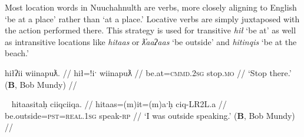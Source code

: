 \vspace{10pt}

Most location words in Nuuchahnulth are verbs, more closely aligning to English `be at a place' rather than `at a place.' Locative verbs are simply juxtaposed with the action performed there. This strategy is used for transitive \textit{hił} `be at' as well as intransitive locations like \textit{hitaas} or \textit{ƛ̓aaʔaas} `be outside' and \textit{hitinqis} `be at the beach.'

\ex \label{ex:stopthere}
\begingl
\glpreamble hiłʔii wiinapuƛ. //
\gla hił=!iˑ wiinapuƛ //
\glb be.at=\textsc{cmmd.2sg} stop.\textsc{mo} //
\glft `Stop there.' (\textbf{B}, Bob Mundy) //
\endgl
\xe

\begin{comment}
\ex \label{ex:workathome}
\begingl
\glpreamble hiłitin maḥt̓iiʔakqas mamuuk. //
\gla hił=(m)it=(m)in maḥt̓ii=ʔak=qaˑs mamuuk //
\glb be.at=\textsc{pst}=\textsc{strg.1pl} house=\textsc{poss}=\textsc{defn.1sg} work.\textsc{dr} //
\glft `We worked at my house.' (\textbf{T}, Fidelia Haiyupis) //
\endgl
\xe

\ex \label{ex:screamatbeach}
\begingl
\glpreamble n̓aʔiičiʔeƛ naʔuu łuucma ʕiikʕiika hitinqis. //
\gla n̓a-iˑčiƛ=!aƛ naʔuu łuucma ʕik-LR2L.a hitinqis //
\glb see-\textsc{in}=\textsc{now} be.with woman=\textsc{poss} scream-\textsc{rp} be.at.beach //
\glft `He heard a woman screaming on the beach.' (\textbf{C}, \textit{tupaat} Julia Lucas) //
\endgl
\xe
\end{comment}


\ex~ \label{ex:speakoutside}
\begingl
\glpreamble hitaasitaḥ ciiqciiqa. //
\gla hitaas=(m)it=(m)aˑḥ ciq-LR2L.a //
\glb be.outside=\textsc{pst}=\textsc{real.1sg} speak-\textsc{rp} //
\glft `I was outside speaking.' (\textbf{B}, Bob Mundy) //
\endgl
\xe

\begin{comment}
\ex~ \label{ex:speakoutside}
\begingl
\glpreamble qiiʔaƛintiis mamuuk ƛ̓aaʔaas. //
\gla qii=!aƛ=int=iis mamuuk ƛ̓aaʔaas //
\glb long.time=\textsc{now}=\textsc{pst}=\textsc{weak.1sg} work.\textsc{dr} be.outside //
\glft `I was working outside for a long time.' (\textbf{Q}, Sophie Billy) //
\endgl
\xe

\ex~ \label{ex:hideonroof}
\begingl
\glpreamble haptsaapaqƛiis suutił hiłaayiłkʷ. //
\gla hapt-saˑp=ʔaqƛ=iis sut-L.(č)ił hił-aˑyił=uk. //
\glb hide-\textsc{mo.caus}=\textsc{fut}=\textsc{weak.1sg} \textsc{2sg}-do.to be.at-on.a.roof=\textsc{poss} //
\glft `I will hide you on the roof.' (\textbf{Q}, Sophie Billy) //
\endgl
\xe
\end{comment}

